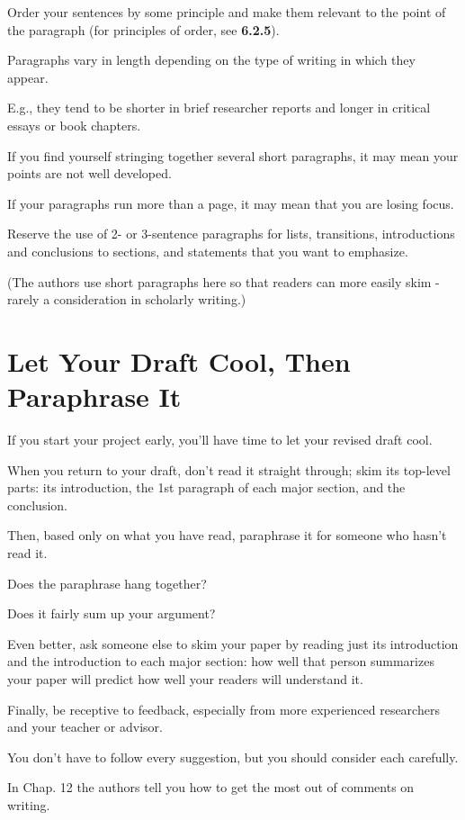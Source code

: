 \documentclass[oneside]{book}
\numberwithin{equation}{section}
\begin{document}
Order your sentences by some principle and make them relevant to the point of the paragraph (for principles of order, see \textbf{6.2.5}).

%
Paragraphs vary in length depending on the type of writing in which they appear.

E.g., they tend to be shorter in brief researcher reports and longer in critical essays or book chapters.

If you find yourself stringing together several short paragraphs, it may mean your points are not well developed.

If your paragraphs run more than a page, it may mean that you are losing focus.

Reserve the use of 2- or 3-sentence paragraphs for lists, transitions, introductions and conclusions to sections, and statements that you want to emphasize.

(The authors use short paragraphs here so that readers can more easily skim - rarely a consideration in scholarly writing.)

\section{Let Your Draft Cool, Then Paraphrase It}
If you start your project early, you'll have time to let your revised draft cool.


When you return to your draft, don't read it straight through; skim its top-level parts: its introduction, the 1st paragraph of each major section, and the conclusion.

Then, based only on what you have read, paraphrase it for someone who hasn't read it.

Does the paraphrase hang together?

Does it fairly sum up your argument?

Even better, ask someone else to skim your paper by reading just its introduction and the introduction to each major section: how well that person summarizes your paper will predict how well your readers will understand it.

%
Finally, be receptive to feedback, especially from more experienced researchers and your teacher or advisor.

You don't have to follow every suggestion, but you should consider each carefully.

In Chap. 12 the authors tell you how to get the most out of comments on writing.
\end{document}
